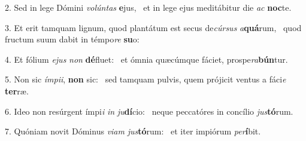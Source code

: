 2. Sed in lege Dómini \textit{vo}\textit{lún}\textit{tas} \textbf{e}jus, \ast\  et in lege ejus meditábitur die \textit{ac} \textbf{noc}te.\

3. Et erit tamquam lignum, quod plantátum est secus de\textit{cúr}\textit{sus} \textit{a}\textbf{quá}rum, \ast\  quod fructum suum dabit in témpo\textit{re} \textbf{su}o:\

4. Et fólium \textit{e}\textit{jus} \textit{non} \textbf{dé}fluet: \ast\  et ómnia quæcúmque fáciet, prospe\textit{ra}\textbf{bún}tur.\

5. Non sic \textit{ím}\textit{pi}\textit{i}, \textbf{non} sic: \ast\  sed tamquam pulvis, quem prójicit ventus a fáci\textit{e} \textbf{ter}ræ.\

6. Ideo non resúrgent ímpi\textit{i} \textit{in} \textit{ju}\textbf{dí}cio: \ast\  neque peccatóres in concílio \textit{jus}\textbf{tó}rum.\

7. Quóniam novit Dóminus \textit{vi}\textit{am} \textit{jus}\textbf{tó}rum: \ast\  et iter impiórum \textit{per}\textbf{í}bit.\

